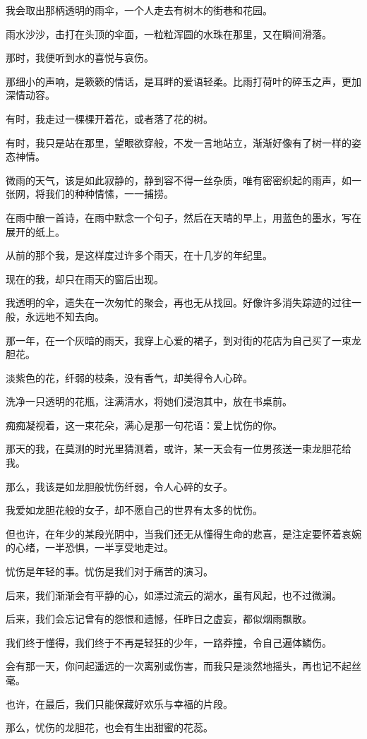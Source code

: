 		我会取出那柄透明的雨伞，一个人走去有树木的街巷和花园。\par
		雨水沙沙，击打在头顶的伞面，一粒粒浑圆的水珠在那里，又在瞬间滑落。\par
		那时，我便听到水的喜悦与哀伤。\par
		那细小的声响，是簌簌的情话，是耳畔的爱语轻柔。比雨打荷叶的碎玉之声，更加深情动容。

		有时，我走过一棵棵开着花，或者落了花的树。\par
		有时，我只是站在那里，望眼欲穿般，不发一言地站立，渐渐好像有了树一样的姿态神情。\par
		微雨的天气，该是如此寂静的，静到容不得一丝杂质，唯有密密织起的雨声，如一张网，将我们的种种情愫，一一捕捞。\par
		在雨中酿一首诗，在雨中默念一个句子，然后在天晴的早上，用蓝色的墨水，写在展开的纸上。\par
		从前的那个我，是这样度过许多个雨天，在十几岁的年纪里。

		现在的我，却只在雨天的窗后出现。\par
		我透明的伞，遗失在一次匆忙的聚会，再也无从找回。好像许多消失踪迹的过往一般，永远地不知去向。

		那一年，在一个灰暗的雨天，我穿上心爱的裙子，到对街的花店为自己买了一束龙胆花。\par
		淡紫色的花，纤弱的枝条，没有香气，却美得令人心碎。\par
		洗净一只透明的花瓶，注满清水，将她们浸泡其中，放在书桌前。\par
		痴痴凝视着，这一束花朵，满心是那一句花语：爱上忧伤的你。\par
		那天的我，在莫测的时光里猜测着，或许，某一天会有一位男孩送一束龙胆花给我。\par
		那么，我该是如龙胆般忧伤纤弱，令人心碎的女子。\par
		我爱如龙胆花般的女子，却不愿自己的世界有太多的忧伤。\par
		但也许，在年少的某段光阴中，当我们还无从懂得生命的悲喜，是注定要怀着哀婉的心绪，一半恐惧，一半享受地走过。

		忧伤是年轻的事。忧伤是我们对于痛苦的演习。

		后来，我们渐渐会有平静的心，如漂过流云的湖水，虽有风起，也不过微澜。\par
		后来，我们会忘记曾有的怨恨和遗憾，任昨日之虚妄，都似烟雨飘散。

		我们终于懂得，我们终于不再是轻狂的少年，一路莽撞，令自己遍体鳞伤。\par
		会有那一天，你问起遥远的一次离别或伤害，而我只是淡然地摇头，再也记不起丝毫。\par
		也许，在最后，我们只能保藏好欢乐与幸福的片段。\par
		那么，忧伤的龙胆花，也会有生出甜蜜的花蕊。

